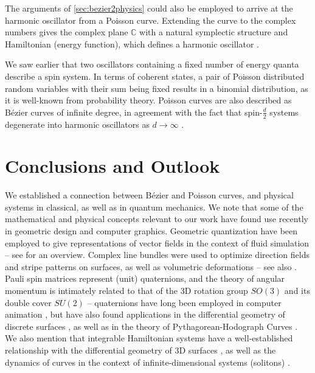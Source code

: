\documentclass[final,3p,mathptmx]{elsarticle}
\begin{document}
The arguments of \autoref{sec:bezier2physics} could also be employed to arrive at the harmonic oscillator from a Poisson curve. Extending the curve to the complex numbers gives the complex plane $\mathbb{C}$ with a natural symplectic structure and Hamiltonian (energy function), which defines a harmonic oscillator \cite{hall2013quantum}.

We saw earlier that two oscillators containing a fixed number of energy quanta describe a spin system. In terms of coherent states, a pair of Poisson distributed random variables with their sum being fixed results in a binomial distribution, as it is well-known from probability theory. Poisson curves are also described as B\'{e}zier curves of infinite degree, in agreement with the fact that spin-$\frac{d}{2}$ systems degenerate into harmonic oscillators as $d \rightarrow \infty$ \cite[Ch. 7.7]{combescure2012coherent}.

\section{Conclusions and Outlook}\label{sec:conc}
We established a connection between B\'{e}zier and Poisson curves, and physical systems in classical, as well as in quantum mechanics. We note that some of the mathematical and physical concepts relevant to our work have found use recently in geometric design and computer graphics. Geometric quantization have been employed to give representations of vector fields in the context of fluid simulation \cite{weissmann2014smoke,chern2016schrodinger,chern2017inside} -- see \cite{chern2017fluid} for an overview. Complex line bundles were used to optimize direction fields \cite{knoppel2013globally} and stripe patterns \cite{knoppel2015stripe} on surfaces, as well as volumetric deformations \cite{chern2015close} -- see also \cite{knoppel2016complex}. Pauli spin matrices represent (unit) quaternions, and the theory of angular momentum is intimately related to that of the 3D rotation group $SO(3)$ and its double cover $SU(2)$ -- quaternions have long been employed in computer animation \cite{hanson2006visualizing}, but have also found applications in the differential geometry of discrete surfaces \cite{bobenko1994surfaces,kamberov2002quaternions,crane2011spin,crane2013conformal,liu2017dirac,ye2018unified,hoffmann2018discrete,chern2018shape}, as well as in the theory of Pythagorean-Hodograph Curves \cite{choi2002clifford,farouki2008pythagorean}. We also mention that integrable Hamiltonian systems have a well-established relationship with the differential geometry of 3D surfaces \cite{terng2000geometry,rogers2002backlund,bobenko2008discrete}, as well as the dynamics of curves \cite{chou2002integrable,capovilla2002hamiltonians,sato2015generalization,inoguchi2018log,chern2018computing} in the context of infinite-dimensional systems (solitons) \cite{palais1997symmetries}. 
\end{document}
